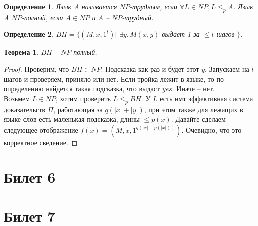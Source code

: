 \documentclass[12pt, letterpaper]{article}
\newtheorem{theorem}{Теорема}[section]
\newtheorem{defi}{Определение}[section]
\newcommand{\leqp}{\leq_{p}}
\begin{document}
\begin{defi}
Язык $A$ называется $NP$-трудным, если $\forall L \in NP, L \leqp A$. Язык A $NP$-полный, если $A\in NP$ и $A$ -- $NP$-трудный. 
\end{defi}

\begin{defi}
$BH = \{ (M, x, 1^t) | $ $\exists y, M(x,y)$ выдает 1 за $\leq t$ шагов  $\}$. 
\end{defi}

\begin{theorem}
$BH$ -- $NP$-полный.
\end{theorem}
\begin{proof}
Проверим, что $BH \in NP$. Подсказка как раз и будет этот $y$. Запускаем на $t$ шагов и проверяем, приняло или нет. Если тройка лежит в языке, то по определению найдется такая подсказка, что выдаст $yes$. Иначе -- нет.\\
Возьмем $L \in NP$, хотим проверить $L \leqp BH$. У $L$ есть нмт эффективная система доказательств $\Pi$, работающая за $q(|x|+|y|)$, при этом также для лежащих в языке слов есть маленькая подсказка, длины $\leq p(x)$. Давайте сделаем следующее отображение $f(x) = (M, x, 1^{q(|x|+p(|x|))})$. Очевидно, что это корректное сведение.

\end{proof}

\section{Билет 6}
\section{Билет 7}
\end{document}
